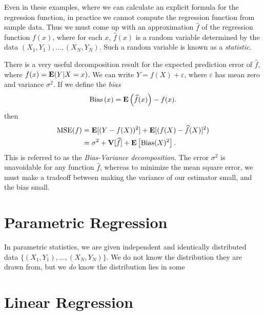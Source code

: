 Even in these examples, where we can calculate an explicit formula for the regression function, in practice we cannot compute the regression function from sample data. Thus we must come up with an approximation $\widehat{f}$ of the regression function $f(x)$, where for each $x$, $\widehat{f}(x)$ is a random variable determined by the data $(X_1,Y_1), \dots, (X_N,Y_N)$. Such a random variable is known as a \emph{statistic}.

There is a very useful decomposition result for the expected prediction error of $\widehat{f}$, where $f(x) = \operatorname{\mathbf{E}}(Y|X=x)$. We can write $Y = f(X) + \varepsilon$, where $\varepsilon$ has mean zero and variance $\sigma^2$. If we define the \emph{bias}
%
\[ \text{Bias} \left( x \right) = \operatorname{\mathbf{E}} \left( \widehat{f}(x) \right) - f(x). \]
%
then
%
\begin{align*}
	\text{MSE}(f) &= \operatorname{\mathbf{E}}[(Y - f(X))^2] + \operatorname{\mathbf{E}}[(f(X) - \widehat{f}(X)]^2)\\
	&= \sigma^2 + \mathbf{V} [\widehat{f}] + \operatorname{\mathbf{E}} \left[ \text{Bias}(X)^2 \right].
\end{align*}
%
This is referred to as the {\it Bias-Variance decomposition}. The error $\sigma^2$ is unavoidable for any function $\widehat{f}$, whereas to minimize the mean square error, we must make a tradeoff between making the variance of our estimator small, and the bias small.

\section{Parametric Regression}

In parametric statistics, we are given independent and identically distributed data $\{ (X_1,Y_1), \dots, (X_N,Y_N) \}$. We do not know the distribution they are drawn from, but we \emph{do} know the distribution lies in some

\section{Linear Regression}


